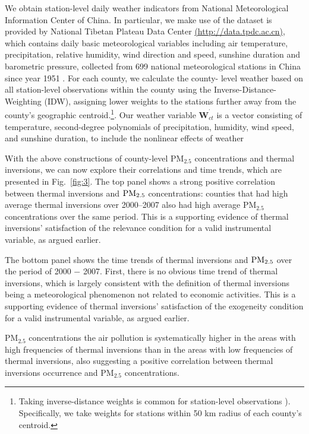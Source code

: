 \documentclass[12pt]{article}
\begin{document}
We obtain station-level daily weather indicators from National
Meteorological Information Center of China. In particular, we make use of
the dataset is provided by National Tibetan Plateau Data Center %
\url{(http://data.tpdc.ac.cn)}, which contains daily basic meteorological
variables including air temperature, precipitation, relative humidity, wind
direction and speed, sunshine duration and barometric pressure, collected
from 699 national meteorological stations in China since year 1951 %
\citep{Dailymeteorologicaldataset}. For each county, we calculate the county-
level weather based on all station-level observations within the county using the
Inverse-Distance-Weighting (IDW), assigning lower weights to the stations
further away from the county's geographic centroid.\footnote{Taking inverse-distance weights 
is common for station-level observations \citep[e.g.,][]{hanigan2006comparison,barreca2012climate,deschenes2011climate}). 
Specifically, we take weights for stations within 50 km radius 
of each county's centroid.}. Our weather variable $\mathbf{W}_{ct}^{^{\prime }}$ is a vector consisting of temperature, second-degree polynomials of precipitation,
humidity, wind speed, and sunshine duration, to
include the nonlinear effects of weather \citep{deschenes2017defensive,chen2022effect}

With the above constructions of county-level $\mathrm{PM_{2.5}}$
concentrations and thermal inversions, we can now explore their correlations
and time trends, which are presented in Fig.~\ref{fig:3}. The top panel
shows a strong positive correlation between thermal inversions and $\mathrm{%
PM_{2.5}}$ concentrations: counties that had high average thermal inversions
over 2000--2007 also had high average $\mathrm{PM_{2.5}}$ concentrations
over the same period. This is a supporting evidence of thermal inversions'
satisfaction of the relevance condition for a valid instrumental variable,
as argued earlier. 

The bottom panel shows the time trends of thermal inversions and $\mathrm{%
PM_{2.5}}$ over the period of 2000 $-$ 2007. First, there is no obvious time
trend of thermal inversions, which is largely consistent with the definition
of thermal inversions being a meteorological phenomenon not related to
economic activities. This is a supporting evidence of thermal
inversions' satisfaction of the exogeneity condition for a valid
instrumental variable, as argued earlier. 

 $\mathrm{PM_{2.5}}$
concentrations the air pollution is systematically higher in the areas with
high frequencies of thermal inversions than in the areas with low frequencies of thermal inversions, also suggesting a
positive correlation between thermal inversions occurrence and $\mathrm{PM_{2.5}}$
concentrations.
\end{document}

